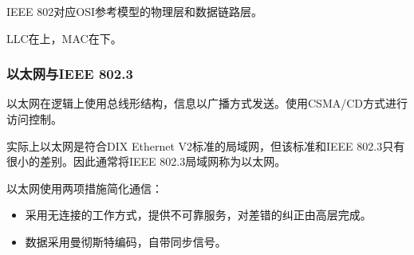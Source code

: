 \documentclass[12pt, a4paper, oneside]{ctexart}
\begin{document}
IEEE 802对应OSI参考模型的物理层和数据链路层。

LLC在上，MAC在下。

\subsubsection{以太网与IEEE 802.3}

以太网在逻辑上使用总线形结构，信息以广播方式发送。使用CSMA/CD方式进行访问控制。

实际上以太网是符合DIX Ethernet V2标准的局域网，但该标准和IEEE 802.3只有很小的差别。因此通常将IEEE 802.3局域网称为以太网。

以太网使用两项措施简化通信：
\begin{itemize}
    \item 采用无连接的工作方式，提供不可靠服务，对差错的纠正由高层完成。
    \item 数据采用曼彻斯特编码，自带同步信号。
\end{itemize}
\end{document}
